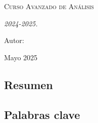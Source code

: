 \documentclass[12pt, a4paper]{article}
\theoremstyle{definition}
\begin{document}
\begin{titlepage}
    \centering
    \vspace{1cm}
    {\bfseries\LARGE \institution \par}
    \vspace{1cm}
    {\scshape\Large Curso Avanzado de Análisis \par}
    \vspace{3cm}
    {\scshape\Huge \projecttitle \par}
    \vspace{3cm}
    {\itshape\Large   
    2024-2025. \par}
    \vfill
    {\Large Autor: \par}
    {\Large \authorname \par}
    \vfill
    {\Large Mayo 2025 \par}
\end{titlepage}


\setlength{\parskip}{0.75em}
\renewcommand{\baselinestretch}{1.25}


\subsection*{Resumen}

\subsection*{Palabras clave}


\tableofcontents
\pagebreak


\pagebreak


\pagebreak




\end{document}
